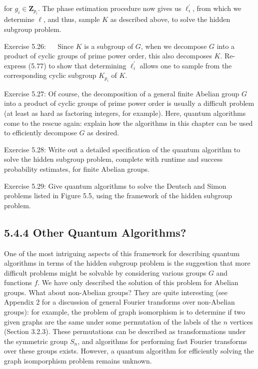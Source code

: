 for $g_{i} \in \mathbf{Z}_{p_{i}}$. The phase estimation procedure now gives us $\ell_{i}^{\prime}$, from which we determine $\ell$, and thus, sample $K$ as described above, to solve the hidden subgroup problem.

Exercise 5.26: $\quad$ Since $K$ is a subgroup of $G$, when we decompose $G$ into a product of cyclic groups of prime power order, this also decomposes $K$. Re-express (5.77) to show that determining $\ell_{i}^{\prime}$ allows one to sample from the corresponding cyclic subgroup $K_{p_{i}}$ of $K$.

Exercise 5.27: Of course, the decomposition of a general finite Abelian group $G$ into a product of cyclic groups of prime power order is usually a difficult problem (at least as hard as factoring integers, for example). Here, quantum algorithms come to the rescue again: explain how the algorithms in this chapter can be used to efficiently decompose $G$ as desired.

Exercise 5.28: Write out a detailed specification of the quantum algorithm to solve the hidden subgroup problem, complete with runtime and success probability estimates, for finite Abelian groups.

Exercise 5.29: Give quantum algorithms to solve the Deutsch and Simon problems listed in Figure 5.5, using the framework of the hidden subgroup problem.

\subsection{5.4.4 Other Quantum Algorithms?}
One of the most intriguing aspects of this framework for describing quantum algorithms in terms of the hidden subgroup problem is the suggestion that more difficult problems might be solvable by considering various groups $G$ and functions $f$. We have only described the solution of this problem for Abelian groups. What about non-Abelian groups? They are quite interesting (see Appendix 2 for a discussion of general Fourier transforms over non-Abelian groups): for example, the problem of graph isomorphism is to determine if two given graphs are the same under some permutation of the labels of the $n$ vertices (Section 3.2.3). These permutations can be described as transformations under the symmetric group $S_{n}$, and algorithms for performing fast Fourier transforms\\
over these groups exists. However, a quantum algorithm for efficiently solving the graph isomporphism problem remains unknown.

